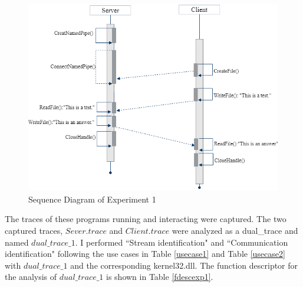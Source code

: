 \begin{figure}[H]
\centerline{\includegraphics[scale=0.6]{Figures/exp1}}
 \caption{Sequence Diagram of Experiment 1}
\label{exp1}
\end{figure}

The traces of these programs running and interacting were captured. The two captured traces, $Sever.trace$ and $Client.trace$ were analyzed as a dual\_trace and named $dual\_trace\_1$. I performed ``Stream identification" and ``Communication identification" following the use cases in Table \ref{usecase1} and Table \ref{usecase2} with $dual\_trace\_1$ and the corresponding kernel32.dll. The function descriptor for the analysis of $dual\_trace\_1$ is shown in Table \ref{fdescexp1}.

